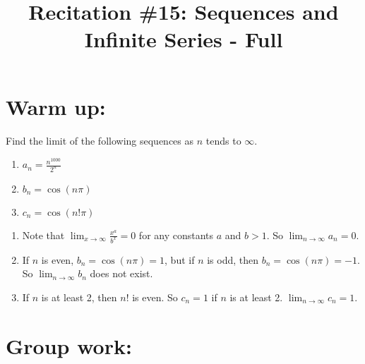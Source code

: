 \documentclass[]{ximera}
\title{Recitation \#15: Sequences and Infinite Series - Full}
\begin{document}
\begin{abstract}		\end{abstract}
\maketitle



\section{Warm up:}
Find the limit of the following sequences as $n$ tends to $\infty$. 
\begin{enumerate}

\item $a_n = \frac{n^{1000}}{2^n}$

	
\item $b_n = \cos (n \pi)$

\item $c_n = \cos (n! \pi)$

\end{enumerate}
	\begin{freeResponse}
\begin{enumerate}	
\item Note that $\lim_{x \to \infty} \frac{x^a}{b^x} = 0$ for any constants $a$ and $b>1$. So $\lim_{n \to \infty} a_n =0$.
\item If $n$ is even, $b_n = \cos(n \pi) = 1$, but if $n$ is odd, then $b_n = \cos(n \pi) = -1$. So $\lim_{n \to \infty} b_n$ does not exist.
\item If $n$ is at least 2, then $n!$ is even. So $c_n = 1$ if $n$ is at least 2. $\lim_{n \to \infty} c_n = 1$. 
\end{enumerate}
	\end{freeResponse}
\begin{instructorNotes}

\end{instructorNotes}







\section{Group work:}
\end{document}
